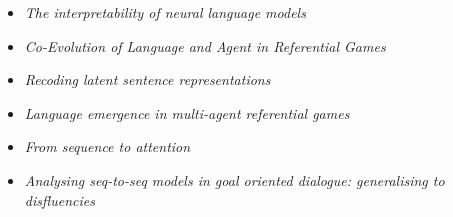 {{{
{\begin{itemize}
  \item[] \textit{The interpretability of neural language models}
\end{itemize}
}}

{
{\begin{itemize}
  \item[] \textit{Co-Evolution of Language and Agent in Referential Games}
\end{itemize}
}

{
{\begin{itemize}
  \item[] \textit{Recoding latent sentence representations}
\end{itemize}
}

{
{\begin{itemize}
  \item[] \textit{Language emergence in multi-agent referential games}
\end{itemize}
}

{
{\begin{itemize}
  \item[] \textit{From sequence to attention}
\end{itemize}
}

{
{\begin{itemize}
  \item[] \textit{Analysing seq-to-seq models in goal oriented dialogue: generalising to disfluencies}
\end{itemize}
}

}}}}}}}

